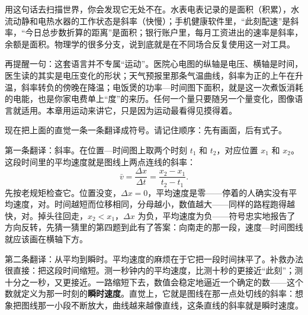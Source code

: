 用这句话去扫描世界，你会发现它无处不在。水表电表记录的是面积（积累），水流动静和电热水器的工作状态是斜率（快慢）；手机健康软件里，“此刻配速”是斜率，“今日总步数折算的距离”是面积；银行账户里，每月工资进出的速率是斜率，余额是面积。物理学的很多分支，说到底就是在不同场合反复使用这一对工具。

再提醒一句：这套语言并不专属“运动”。医院心电图的纵轴是电压、横轴是时间，医生读的其实是电压变化的形状；天气预报里那条气温曲线，斜率为正的上午在升温，斜率转负的傍晚在降温；电饭煲的功率—时间图下面积，就是这一次煮饭消耗的电能，也是你家电费单上“度”的来历。任何一个量只要随另一个量变化，图像语言就适用。本章用运动来讲它，只是因为运动最看得见摸得着。


现在把上面的直觉一条一条翻译成符号。请记住顺序：先有画面，后有式子。

第一条翻译：斜率。在位置—时间图上取两个时刻 \(t_1\) 和 \(t_2\)，对应位置 \(x_1\) 和 \(x_2\)。这段时间里的平均速度就是图线上两点连线的斜率：
\[
\bar{v}=\frac{\Delta x}{\Delta t}=\frac{x_2-x_1}{t_2-t_1}.
\]
先按老规矩检查它。位置没变，\(\Delta x=0\)，平均速度是零——停着的人确实没有平均速度，对。时间越短而位移相同，分母越小，数值越大——同样的路程跑得越快，对。掉头往回走，\(x_2<x_1\)，\(\Delta x\) 为负，平均速度为负——符号忠实地报告了方向反转，先猜一猜里的第四题到此有了答案：向南走的那一段，速度—时间图线就应该画在横轴下方。

\begin{center}
\end{center}

第二条翻译：从平均到瞬时。平均速度的麻烦在于它把一段时间抹平了。补救办法很直接：把这段时间缩短。测一秒钟内的平均速度，比测十秒的更接近“此刻”；测十分之一秒，又更接近。一路缩短下去，数值会稳定地逼近一个确定的数——这个数就定义为那一时刻的\textbf{瞬时速度}。直觉上，它就是图线在那一点处切线的斜率：想象把图线那一小段不断放大，曲线越来越像直线，这条直线的斜率就是瞬时速度。


